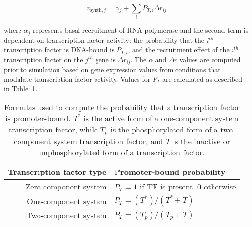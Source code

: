 \documentclass[12pt]{article}
\begin{document}
\begin{equation}
v_{\text{synth}, j} = \alpha_j + \sum_{i} P_{T, i} \Delta r_{i j}
\end{equation}

\noindent where \(\alpha_j\) represents basal recruitment of RNA polymerase and the second term is dependent on transcription factor activity: the probability that the \(i^{th}\) transcription factor is DNA-bound is \(P_{T, i}\), and the recruitment effect of the \(i^{th}\) transcription factor on the \(j^{th}\) gene is \(\Delta r_{i j}\). The \(\alpha\) and \(\Delta r\) values are computed prior to simulation based on gene expression values from conditions that modulate transcription factor activity.  Values for \(P_T\) are calculated as described in Table~\ref{table:transcription_pt}.


\begin{table}[!hbt]
\centering
\begin{tabular}{r l}
Transcription factor type & Promoter-bound probability \\
\hline
Zero-component system & \(P_T = 1\) if TF is present, \(0\) otherwise \\
One-component system & \(P_T = (T^*) / (T^* + T)\) \\
Two-component system & \(P_T = (T_p) / (T_p + T)\) \\
\end{tabular}
\caption[Formulas used to compute the probability that a transcription factor is promoter-bound.]{Formulas used to compute the probability that a transcription factor is promoter-bound. \(T^*\) is the active form of a one-component system transcription factor, while \(T_p\) is the phosphorylated form of a two-component system transcription factor, and \(T\) is the inactive or unphosphorylated form of a transcription factor.}
\label{table:transcription_pt}
\end{table}

\hspace{1cm}
\end{document}
